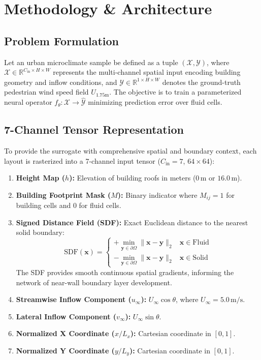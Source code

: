\documentclass[10pt,twocolumn]{article}
\begin{document}
\section{Methodology & Architecture}
\subsection{Problem Formulation}
Let an urban microclimate sample be defined as a tuple $(\mathcal{X}, \mathcal{Y})$, where $\mathcal{X} \in \mathbb{R}^{C_{\text{in}} \times H \times W}$ represents the multi-channel spatial input encoding building geometry and inflow conditions, and $\mathcal{Y} \in \mathbb{R}^{1 \times H \times W}$ denotes the ground-truth pedestrian wind speed field $U_{1.75\text{m}}$. The objective is to train a parameterized neural operator $f_\theta: \mathcal{X} \to \widehat{\mathcal{Y}}$ minimizing prediction error over fluid cells.

\subsection{7-Channel Tensor Representation}
To provide the surrogate with comprehensive spatial and boundary context, each layout is rasterized into a 7-channel input tensor ($C_{\text{in}} = 7$, $64 \times 64$):
\begin{enumerate}
    \item \textbf{Height Map ($h$):} Elevation of building roofs in meters ($0\,\text{m}$ or $16.0\,\text{m}$).
    \item \textbf{Building Footprint Mask ($M$):} Binary indicator where $M_{ij} = 1$ for building cells and $0$ for fluid cells.
    \item \textbf{Signed Distance Field (SDF):} Exact Euclidean distance to the nearest solid boundary:
    \begin{equation}
        \text{SDF}(\mathbf{x}) = \begin{cases} 
        +\min_{\mathbf{y} \in \partial \Omega} \|\mathbf{x} - \mathbf{y}\|_2 & \mathbf{x} \in \text{Fluid} \\
        -\min_{\mathbf{y} \in \partial \Omega} \|\mathbf{x} - \mathbf{y}\|_2 & \mathbf{x} \in \text{Solid}
        \end{cases}
    \end{equation}
    The SDF provides smooth continuous spatial gradients, informing the network of near-wall boundary layer development.
    \item \textbf{Streamwise Inflow Component ($u_\infty$):} $U_\infty \cos \theta$, where $U_\infty = 5.0\,\text{m/s}$.
    \item \textbf{Lateral Inflow Component ($v_\infty$):} $U_\infty \sin \theta$.
    \item \textbf{Normalized X Coordinate ($x / L_x$):} Cartesian coordinate in $[0, 1]$.
    \item \textbf{Normalized Y Coordinate ($y / L_y$):} Cartesian coordinate in $[0, 1]$.
\end{enumerate}
\end{document}
